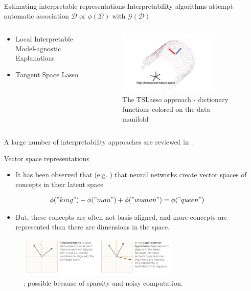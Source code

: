 \begin{frame}[fragile]{Estimating interpretable representations}
Interpretability algorithms attempt automatic association $\mathcal D$ or $\phi(\mathcal D)$ with $\mathcal G (\mathcal D)$
\begin{columns}
\begin{column}{.5\textwidth}
\begin{itemize}
    \item Local Interpretable Model-agnostic Explanations \citep{Ribeiro2016-rm}
    \item Tangent Space Lasso \citep{Koelle2024-no}
\end{itemize}
\end{column}
\begin{column}{.5\textwidth}
\begin{figure}
    \includegraphics[width=5cm]{img/swisstangent.png}
    \caption*{The TSLasso approach - dictionary functions colored on the data manifold}
\end{figure}
\end{column}
\end{columns}
A large number of interpretability approaches are reviewed in \citet{Elhage-ob, Molnar2023-le}.
\end{frame}

\begin{frame}{Vector space representations}
\begin{itemize}
    \item It has been observed that (e.g. \citep{Mikolov2013-bs}) that neural networks create vector spaces of concepts in their latent space
\end{itemize}
\begin{align*}
    \phi("king") - \phi("man") + \phi("woman") = \phi("queen")
\end{align*}
\begin{itemize}
\item But, these concepts are often not basis aligned, and more concepts are represented than there are dimensions in the space.
\end{itemize}
\begin{figure}
    \centering
    \includegraphics[width=8cm]{img/superposition.png}
    \caption*{\citet{Elhage-ob}: possible because of sparsity and noisy computation.}
    \label{fig:enter-label}
\end{figure}
\end{frame}

